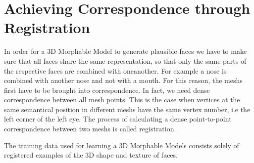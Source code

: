 \section{Achieving Correspondence through Registration}
In order for a 3D Morphable Model to generate plausible faces we have to make sure that all faces share the same representation, so that only the same parts of the respective faces are combined with oneanother. For example a nose is combined with another nose and not with a mouth. For this reason, the meshs first have to be brought into correspondence. In fact, we need dense correspondence between all mesh points. This is the case when vertices at the same semantical position in
different meshs have the same vertex number, i.e the left corner of the left eye. The process of calculating a dense point-to-point correspondence between two meshs is called registration.  

The training data used for learning a 3D Morphable Models consists solely of registered examples of the 3D shape and texture of faces.

